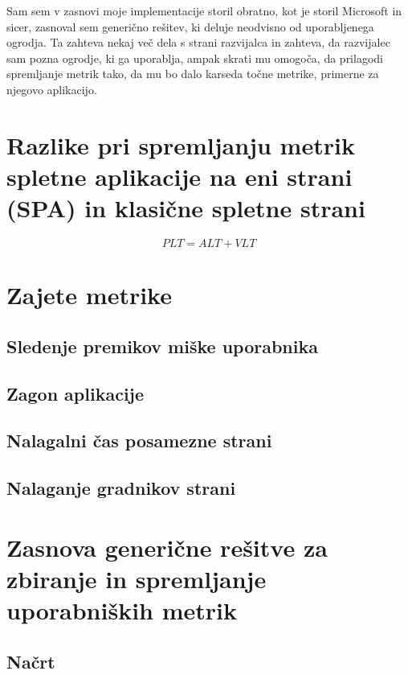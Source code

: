\documentclass[a4paper, 12pt]{book}
\begin{document}
Sam sem v zasnovi moje implementacije storil obratno, kot je storil Microsoft in sicer, zasnoval sem generično rešitev, ki deluje neodvisno od uporabljenega ogrodja. Ta zahteva nekaj več dela s strani razvijalca in zahteva, da razvijalec sam pozna ogrodje, ki ga uporablja, ampak skrati mu omogoča, da prilagodi spremljanje metrik tako, da mu bo dalo karseda točne metrike, primerne za njegovo aplikacijo.

\chapter{Razlike pri spremljanju metrik spletne aplikacije na eni strani (SPA) in klasične spletne strani}
\label{ch1}

\begin{equation}
\label{eq-01}
PLT = ALT + VLT
\end{equation}

\chapter{Zajete metrike}
\label{ch2}

\section{Sledenje premikov miške uporabnika}

\section{Zagon aplikacije}

\section{Nalagalni čas posamezne strani}

\section{Nalaganje gradnikov strani}

\chapter{Zasnova generične rešitve za zbiranje in spremljanje uporabniških metrik}
\label{ch3}

\section{Načrt}
\end{document}
